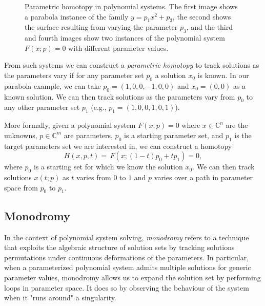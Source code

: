 \begin{figure}[hb]
{
		\label{fig:parametric_homotopy_instance2}
	}
	\caption{Parametric homotopy in polynomial systems. The first image shows a parabola instance of the family $y = p_1 x^2 + p_3$, the second shows the surface resulting from varying the parameter $p_3$, and the third and fourth images show two instances of the polynomial system $F(x; p) = 0$ with different parameter values.}
\end{figure}

From such systems we can construct a \emph{parametric homotopy} to track solutions as the parameters vary if for any parameter set $p_0$ a solution $x_0$ is known. In our parabola example, we can take \(p_0 = (1, 0, 0, -1, 0, 0)\) and \(x_0 = (0, 0)\) as a known solution. We can then track solutions as the parameters vary from \(p_0\) to any other parameter set \(p_1\) (e.g., \(p_1 = (1, 0, 0, 1, 0, 1)\)).

More formally, given a polynomial system \(F(x; p) = 0\) where \(x \in \mathbb{C}^n\) are the unknowns, \(p \in \mathbb{C}^m\) are parameters, $p_0$ is a starting parameter set, and $p_1$ is the target parameters set we are interested in, we can construct a homotopy
\[
H(x, p, t) = \,F(x; (1-t)p_0 + tp_1) = 0,
\]
where $p_0$ is a starting set for which we know the solution $x_0$.
We can then track solutions \(x(t; p)\) as \(t\) varies from \(0\) to \(1\) and \(p\) varies over a path in parameter space from $p_0$ to $p_1$.

\subsection{Monodromy}
\label{sec:monodromy}

In the context of polynomial system solving, \emph{monodromy} refers to a technique that exploits the algebraic structure of solution sets by tracking solutions permutations under continuous deformations of the parameters. In particular, when a parameterized polynomial system admits multiple solutions for generic parameter values, monodromy allows us to expand the solution set by performing loops in parameter space. It does so by observing the behaviour of the system when it "runs around" a singularity.

